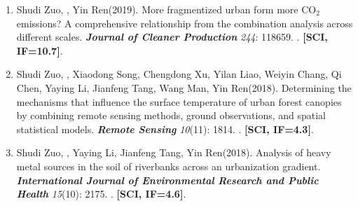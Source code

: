 \begin{enumerate}
    Natural environment and childhood obesity: a systematic review.
    \textbf{\textit{Obesity Reviews}} \textit{22}: e13097.
    . \textbf{[SCI, IF=7.6]}.
\item
    Shudi Zuo, \Shaoqing, Yin Ren\CS (2019).
    More fragmentized urban form more CO$_2$ emissions? A comprehensive relationship from the combination analysis across different scales.
    \textbf{\textit{Journal of Cleaner Production}} \textit{244}: 118659.
    . \textbf{[SCI, IF=10.7]}.
\item
    Shudi Zuo, \Shaoqing, Xiaodong Song, Chengdong Xu, Yilan Liao, Weiyin Chang, Qi Chen, Yaying Li, Jianfeng Tang, Wang Man, Yin Ren\CS (2018).
    Determining the mechanisms that influence the surface temperature of urban forest canopies by combining remote sensing methods, ground observations, and spatial statistical models. 
    \textbf{\textit{Remote Sensing}} \textit{10}(11): 1814.
    . \textbf{[SCI, IF=4.3]}.
\item
    Shudi Zuo, \Shaoqing, Yaying Li, Jianfeng Tang, Yin Ren\CS (2018).
	Analysis of heavy metal sources in the soil of riverbanks across an urbanization gradient.
    \textbf{\textit{International Journal of Environmental Research and Public Health}} \textit{15}(10): 2175.
    . \textbf{[SCI, IF=4.6]}.
\end{enumerate}

